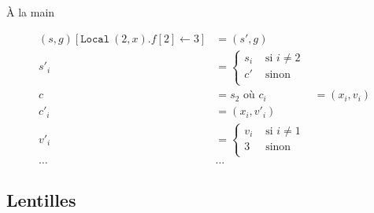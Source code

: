 \begin{frame}{À la main}

\begin{align*}
(s, g)[\texttt{Local}~(2, x).f[2] ← 3] &= (s', g) \\
                   s'_i &= \begin{cases}
                             s_i & \mbox{ si } i ≠ 2\\
                             c'  & \mbox{ sinon} \\
                           \end{cases}\\
                         c &= s_{2} \mbox{ où } c_i &= (x_i, v_i) \\
                   c'_i &= (x_i, v'_i) \\
                   v'_i &= \begin{cases}
                              v_i &  \mbox{ si } i ≠ 1 \\
                              3   &  \mbox{ sinon }\\
                           \end{cases} \\
                    … & …
\end{align*}
\end{frame}

\subsection{Lentilles}



\def\lensNodeBigX#1{
    \vcenter{\hbox{\scalebox{0.5}{
    \begin{tikzpicture}
        \node[bignode, ultra thick] (A) {};
        \node[smallnode, ultra thick, fill=#1] at (A) {};
    \end{tikzpicture}
    } } }
}

\def\lensInnerX#1{
    \vcenter{\hbox{\scalebox{0.5}{
    \begin{tikzpicture}
        \node[smallnode, ultra thick, fill=#1] {};
    \end{tikzpicture}
    } } }
}

